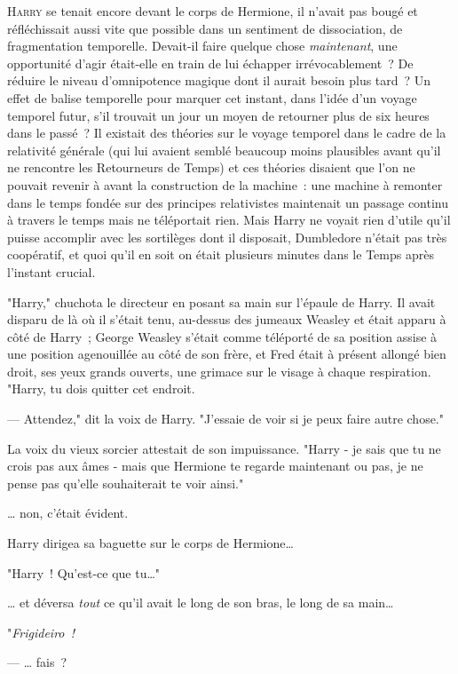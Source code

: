 
\lettrine{H}{arry} se tenait encore devant le corps de Hermione, il n'avait pas bougé et réfléchissait aussi vite que possible dans un sentiment de dissociation, de fragmentation temporelle. Devait-il faire quelque chose \emph{maintenant}, une opportunité d'agir était-elle en train de lui échapper irrévocablement~? De réduire le niveau d'omnipotence magique dont il aurait besoin plus tard~? Un effet de balise temporelle pour marquer cet instant, dans l'idée d'un voyage temporel futur, s'il trouvait un jour un moyen de retourner plus de six heures dans le passé~? Il existait des théories sur le voyage temporel dans le cadre de la relativité générale (qui lui avaient semblé beaucoup moins plausibles avant qu'il ne rencontre les Retourneurs de Temps) et ces théories disaient que l'on ne pouvait revenir à avant la construction de la machine~: une machine à remonter dans le temps fondée sur des principes relativistes maintenait un passage continu à travers le temps mais ne téléportait rien. Mais Harry ne voyait rien d'utile qu'il puisse accomplir avec les sortilèges dont il disposait, Dumbledore n'était pas très coopératif, et quoi qu'il en soit on était plusieurs minutes dans le Temps après l'instant crucial.

"Harry," chuchota le directeur en posant sa main sur l'épaule de Harry. Il avait disparu de là où il s'était tenu, au-dessus des jumeaux Weasley et était apparu à côté de Harry~; George Weasley s'était comme téléporté de sa position assise à une position agenouillée au côté de son frère, et Fred était à présent allongé bien droit, ses yeux grands ouverts, une grimace sur le visage à chaque respiration. "Harry, tu dois quitter cet endroit.

--- Attendez," dit la voix de Harry. "J'essaie de voir si je peux faire autre chose."

La voix du vieux sorcier attestait de son impuissance. "Harry - je sais que tu ne crois pas aux âmes - mais que Hermione te regarde maintenant ou pas, je ne pense pas qu'elle souhaiterait te voir ainsi."

… non, c'était évident.

Harry dirigea sa baguette sur le corps de Hermione…

"Harry~! Qu'est-ce que tu…"

… et déversa \emph{tout} ce qu'il avait le long de son bras, le long de sa main…

"\emph{Frigideiro~!}

--- … fais~?


